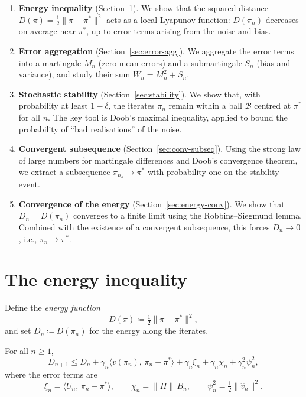 \documentclass[a4paper,oneside,11pt]{report}
\newcommand{\calB}{\mathcal{B}}
\newcommand{\ip}[2]{\langle #1,\, #2 \rangle}
\newcommand{\norm}[1]{\| #1 \|}
\numberwithin{theorem}{chapter}
\numberwithin{equation}{chapter}
\begin{document}
\begin{enumerate}
\item \textbf{Energy inequality} (Section~\ref{sec:energy-ineq}). We
  show that the squared distance
  $D(\pi) = \tfrac{1}{2}\norm{\pi - \pi^*}^2$ acts as a local Lyapunov
  function: $D(\pi_n)$ decreases on average near $\pi^*$, up to error
  terms arising from the noise and bias.

\item \textbf{Error aggregation} (Section~\ref{sec:error-agg}). We
  aggregate the error terms into a martingale $M_n$ (zero-mean errors)
  and a submartingale $S_n$ (bias and variance), and study their sum
  $W_n = M_n^2 + S_n$.

\item \textbf{Stochastic stability} (Section~\ref{sec:stability}). We
  show that, with probability at least $1-\delta$, the iterates $\pi_n$
  remain within a ball $\calB$ centred at $\pi^*$ for all $n$. The key
  tool is Doob's maximal inequality, applied to bound the probability of
  ``bad realisations'' of the noise.

\item \textbf{Convergent subsequence}
  (Section~\ref{sec:conv-subseq}). Using the strong law of large numbers
  for martingale differences and Doob's convergence theorem, we extract
  a subsequence $\pi_{n_k} \to \pi^*$ with probability one on the
  stability event.

\item \textbf{Convergence of the energy} (Section~\ref{sec:energy-conv}).
  We show that $D_n = D(\pi_n)$ converges to a finite limit using the
  Robbins--Siegmund lemma. Combined with the existence of a convergent
  subsequence, this forces $D_n \to 0$, i.e., $\pi_n \to \pi^*$.
\end{enumerate}

\section{The energy inequality}
\label{sec:energy-ineq}

Define the \emph{energy function}
\begin{equation}
  \label{eq:energy}
  D(\pi) \coloneqq \tfrac{1}{2}\norm{\pi - \pi^*}^2,
\end{equation}
and set $D_n \coloneqq D(\pi_n)$ for the energy along the iterates.

\begin{lemma}
  \label{lem:energy-ineq}
  For all $n \ge 1$,
  \begin{equation}
    \label{eq:energy-ineq}
    D_{n+1} \le D_n + \gamma_n \ip{v(\pi_n)}{\pi_n - \pi^*}
    + \gamma_n \xi_n + \gamma_n \chi_n + \gamma_n^2 \psi_n^2,
  \end{equation}
  where the error terms are
  \begin{equation}
    \label{eq:error-terms}
    \xi_n = \ip{U_n}{\pi_n - \pi^*}, \qquad
    \chi_n = \norm{\Pi}\, B_n, \qquad
    \psi_n^2 = \tfrac{1}{2}\norm{\hat v_n}^2.
  \end{equation}
\end{lemma}
\end{document}
